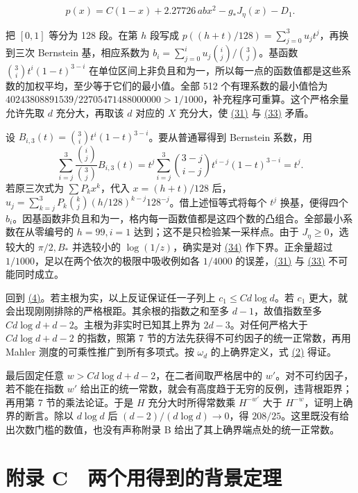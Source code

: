 \documentclass[11pt,a4paper]{article}
\begin{document}
\[
 p(x)=C(1-x)+2.27726\,abx^2-g_*J_\eta(x)-D_1 .                           \tag{34}\label{eq:34}
\]

把 \([0,1]\) 等分为 128 段。在第 \(h\) 段写成 \(p((h+t)/128)=\sum_{j=0}^3u_jt^j\)，再换到三次 Bernstein 基，相应系数为 \(b_i=\sum_{j=0}^iu_j\binom ij/\binom3j\)。基函数 \(\binom3i t^i(1-t)^{3-i}\) 在单位区间上非负且和为一，所以每一点的函数值都是这些系数的加权平均，至少等于它们的最小值。全部 512 个有理系数的最小值恰为 \(40243808891539/22705471488000000>1/1000\)，补充程序可重算。这个严格余量允许先取 \(d\) 充分大，再取该 \(d\) 对应的 \(X\) 充分大，使 \hyperref[eq:31]{(31)} 与 \hyperref[eq:33]{(33)} 矛盾。

设 \(B_{i,3}(t)=\binom3i t^i(1-t)^{3-i}\)。要从普通幂得到 Bernstein 系数，用 \[
 \sum_{i=j}^3\frac{\binom ij}{\binom3j}B_{i,3}(t)
 =t^j\sum_{i=j}^3\binom{3-j}{i-j}t^{i-j}(1-t)^{3-i}=t^j .
\] 若原三次式为 \(\sum P_k x^k\)，代入 \(x=(h+t)/128\) 后， \(u_j=\sum_{k=j}^3P_k\binom kj(h/128)^{k-j}128^{-j}\)。借上述恒等式将每个 \(t^j\) 换基，便得四个 \(b_i\)。因基函数非负且和为一，格内每一函数值都是这四个数的凸组合。全部最小系数在从零编号的 \(h=99,i=1\) 达到；这不是只检验某一采样点。由于 \(J_\eta\ge0\)，选较大的 \(\pi/2,B_*\) 并选较小的 \(\log(1/z)\)，确实是对 \hyperref[eq:34]{(34)} 作下界。正余量超过 \(1/1000\)，足以在两个依次的极限中吸收例如各 \(1/4000\) 的误差，\hyperref[eq:31]{(31)} 与 \hyperref[eq:33]{(33)} 不可能同时成立。

回到 \hyperref[eq:4]{(4)}。若主根为实，以上反证保证任一子列上 \(c_1\le C d\log d\)。若 \(c_1\) 更大，就会出现刚刚排除的严格根距。其余根的指数之和至多 \(d-1\)，故值指数至多 \(C d\log d+d-2\)。主根为非实时已知其上界为 \(2d-3\)。对任何严格大于 \(C d\log d+d-2\) 的指数，照第 7 节的方法先获得不可约因子的统一正常数，再用 Mahler 测度的可乘性推广到所有多项式。按 \(\omega_d\) 的上确界定义，式 \hyperref[eq:2]{(2)} 得证。

最后固定任意 \(w>Cd\log d+d-2\)，在二者间取严格居中的 \(w'\)。对不可约因子，若不能在指数 \(w'\) 给出正的统一常数，就会有高度趋于无穷的反例，违背根距界；再用第 7 节的乘法论证。于是 \(H\) 充分大时所得常数乘 \(H^{-w'}\) 大于 \(H^{-w}\)，证明上确界的断言。除以 \(d\log d\) 后 \((d-2)/(d\log d)\to0\)，得 \(208/25\)。这里既没有给出次数门槛的数值，也没有声称附录 B 给出了其上确界端点处的统一正常数。

\section{附录 C　两个用得到的背景定理}\label{ux9644ux5f55-c-ux4e24ux4e2aux7528ux5f97ux5230ux7684ux80ccux666fux5b9aux7406}
\end{document}
